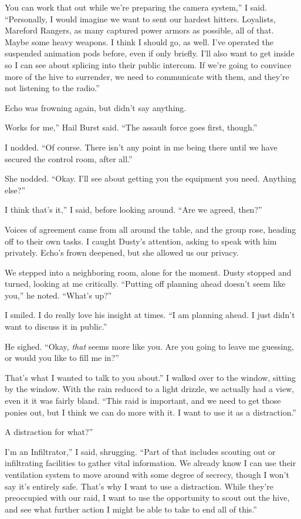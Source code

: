 \leavevmode{}You can work that out while we’re preparing the camera system,” I said. “Personally, I would imagine we want to sent our hardest hitters. Loyalists, Mareford Rangers, as many captured power armors as possible, all of that. Maybe some heavy weapons. I think I should go, as well. I’ve operated the suspended animation pods before, even if only briefly. I’ll also want to get inside so I can see about splicing into their public intercom. If we’re going to convince more of the hive to surrender, we need to communicate with them, and they’re not listening to the radio.”

Echo was frowning again, but didn’t say anything.

\leavevmode{}Works for me,” Hail Burst said. “The assault force goes first, though.”

I nodded. “Of course. There isn’t any point in me being there until we have secured the control room, after all.”

She nodded. “Okay. I’ll see about getting you the equipment you need. Anything else?”

\leavevmode{}I think that’s it,” I said, before looking around. “Are we agreed, then?”

Voices of agreement came from all around the table, and the group rose, heading off to their own tasks. I caught Dusty’s attention, asking to speak with him privately. Echo’s frown deepened, but she allowed us our privacy.

We stepped into a neighboring room, alone for the moment. Dusty stopped and turned, looking at me critically. “Putting off planning ahead doesn’t seem like you,” he noted. “What’s up?”

I smiled. I do really love his insight at times. “I am planning ahead. I just didn’t want to discuss it in public.”

He sighed. “Okay, \textit{that} seems more like you. Are you going to leave me guessing, or would you like to fill me in?”

\leavevmode{}That’s what I wanted to talk to you about.” I walked over to the window, sitting by the window. With the rain reduced to a light drizzle, we actually had a view, even it it was fairly bland. “This raid is important, and we need to get those ponies out, but I think we can do more with it. I want to use it as a distraction.”

\leavevmode{}A distraction for what?”

\leavevmode{}I’m an Infiltrator,” I said, shrugging. “Part of that includes scouting out or infiltrating facilities to gather vital information. We already know I can use their ventilation system to move around with some degree of secrecy, though I won’t say it’s entirely safe. That’s why I want to use a distraction. While they’re preoccupied with our raid, I want to use the opportunity to scout out the hive, and see what further action I might be able to take to end all of this.”


